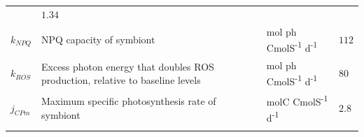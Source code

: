 \documentclass[]{elsarticle} %
\begin{document}
\begin{longtable}[c]{@{}llll@{}}
\begin{minipage}[t]{0.25\columnwidth}
\strut\end{minipage} &
\begin{minipage}[t]{0.10\columnwidth}\raggedright\strut
\(1.34\)
\strut\end{minipage}\tabularnewline
\begin{minipage}[t]{0.10\columnwidth}\raggedright\strut
\(k_{NPQ}\)
\strut\end{minipage} &
\begin{minipage}[t]{0.48\columnwidth}\raggedright\strut
NPQ capacity of symbiont
\strut\end{minipage} &
\begin{minipage}[t]{0.25\columnwidth}\raggedright\strut
mol ph CmolS\textsuperscript{-1} d\textsuperscript{-1}
\strut\end{minipage} &
\begin{minipage}[t]{0.10\columnwidth}\raggedright\strut
\(112\)
\strut\end{minipage}\tabularnewline
\begin{minipage}[t]{0.10\columnwidth}\raggedright\strut
\(k_{ROS}\)
\strut\end{minipage} &
\begin{minipage}[t]{0.48\columnwidth}\raggedright\strut
Excess photon energy that doubles ROS production, relative to baseline
levels
\strut\end{minipage} &
\begin{minipage}[t]{0.25\columnwidth}\raggedright\strut
mol ph CmolS\textsuperscript{-1} d\textsuperscript{-1}
\strut\end{minipage} &
\begin{minipage}[t]{0.10\columnwidth}\raggedright\strut
\(80\)
\strut\end{minipage}\tabularnewline
\begin{minipage}[t]{0.10\columnwidth}\raggedright\strut
\(j_{CPm}\)
\strut\end{minipage} &
\begin{minipage}[t]{0.48\columnwidth}\raggedright\strut
Maximum specific photosynthesis rate of symbiont
\strut\end{minipage} &
\begin{minipage}[t]{0.25\columnwidth}\raggedright\strut
molC CmolS\textsuperscript{-1} d\textsuperscript{-1}
\strut\end{minipage} &
\begin{minipage}[t]{0.10\columnwidth}\raggedright\strut
\(2.8\)
\strut\end{minipage}\tabularnewline
\begin{minipage}[t]{0.10\columnwidth}\raggedright\strut

\end{minipage}
\end{longtable}
\end{document}
